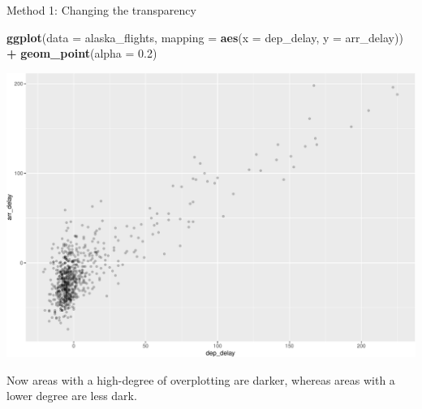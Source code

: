 \documentclass[
  ignorenonframetext,
]{beamer}
\newenvironment{Shaded}{\begin{snugshade}}{\end{snugshade}}
\newcommand{\AttributeTok}[1]{\textcolor[rgb]{0.13,0.29,0.53}{#1}}
\newcommand{\FloatTok}[1]{\textcolor[rgb]{0.00,0.00,0.81}{#1}}
\newcommand{\FunctionTok}[1]{\textcolor[rgb]{0.13,0.29,0.53}{\textbf{#1}}}
\newcommand{\NormalTok}[1]{#1}
\newcommand{\SpecialCharTok}[1]{\textcolor[rgb]{0.81,0.36,0.00}{\textbf{#1}}}
\begin{document}
\begin{frame}[fragile]{Method 1: Changing the transparency}
\protect\hypertarget{method-1-changing-the-transparency-1}{}
\tiny

\begin{Shaded}
\begin{Highlighting}[]
\FunctionTok{ggplot}\NormalTok{(}\AttributeTok{data =}\NormalTok{ alaska\_flights, }\AttributeTok{mapping =} \FunctionTok{aes}\NormalTok{(}\AttributeTok{x =}\NormalTok{ dep\_delay, }\AttributeTok{y =}\NormalTok{ arr\_delay)) }\SpecialCharTok{+} 
  \FunctionTok{geom\_point}\NormalTok{(}\AttributeTok{alpha =} \FloatTok{0.2}\NormalTok{)}
\end{Highlighting}
\end{Shaded}

\begin{center}\includegraphics[width=0.7\linewidth,height=0.5\textheight]{Week2_files/figure-beamer/unnamed-chunk-22-1} \end{center}
\normalsize

Now areas with a high-degree of overplotting are darker, whereas areas
with a lower degree are less dark.
\end{frame}
\end{document}
